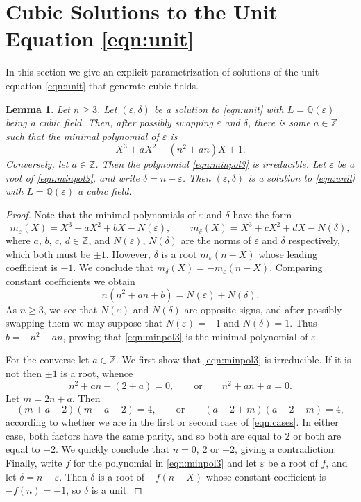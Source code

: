 \documentclass{amsart}
\newcommand{\Q}{\mathbb{Q}}
\newcommand{\Z}{\mathbb{Z}}
\newtheorem{lem}[thm]{Lemma}
\theoremstyle{definition}
\theoremstyle{remark}
\begin{document}
\section{Cubic Solutions to the Unit Equation \eqref{eqn:unit}}
In this section we give an explicit parametrization of solutions
of the unit equation \eqref{eqn:unit} that generate cubic fields.
\begin{lem}\label{lem:minpol}
Let $n \ge 3$. Let $(\varepsilon,\delta)$ be a solution
	to \eqref{eqn:unit} with $L=\Q(\varepsilon)$ being
	a cubic field. Then,
	after possibly swapping $\varepsilon$ and $\delta$,
	there is some $a \in \Z$
	such that the minimal polynomial
	of $\varepsilon$ is 
	\begin{equation}\label{eqn:minpol3}
		X^3+a X^2-(n^2+an)X+1.
	\end{equation}
	Conversely, let $a \in \Z$.  Then the polynomial
	\eqref{eqn:minpol3} is irreducible. Let
	$\varepsilon$ be
	a root of \eqref{eqn:minpol3},
	and write $\delta=n-\varepsilon$. Then $(\varepsilon,\delta)$
	is a solution to \eqref{eqn:unit} with $L=\Q(\varepsilon)$
	a cubic field.
\end{lem}
\begin{proof}
	Note that the minimal polynomials of $\varepsilon$
	and $\delta$ have the form
	\begin{equation}\label{eqn:ms}
		m_\varepsilon(X)=X^3+aX^2+bX-N(\varepsilon), \qquad m_\delta(X)=X^3+cX^2+dX-N(\delta),
	\end{equation}
	where $a$, $b$, $c$, $d \in \Z$, and $N(\varepsilon)$, $N(\delta)$ are the norms of $\varepsilon$
	and $\delta$ respectively, which both must be $\pm 1$. 
	However, $\delta$ is a root $m_\varepsilon(n-X)$ whose leading
	coefficient is $-1$. We conclude that $m_\delta(X)=-m_\varepsilon(n-X)$.
	Comparing constant coefficients we obtain
	\[
		n(n^2+an+b)=N(\varepsilon)+N(\delta).
	\]
	As $n \ge 3$, we see that $N(\varepsilon)$ and $N(\delta)$
	are opposite signs, and after possibly swapping them
	we may suppose that $N(\varepsilon)=-1$ and $N(\delta)=1$.
	Thus $b=-n^2-an$, proving that \eqref{eqn:minpol3}
	is the minimal polynomial of $\varepsilon$.

	For the converse let $a \in \Z$. We first show that
	\eqref{eqn:minpol3} is irreducible. If it is not then
	$\pm 1$ is a root, whence
	\begin{equation}\label{eqn:cases}
		n^2+an-(2+a)=0, \qquad \text{or} \qquad n^2+an+a=0.
	\end{equation}
	Let $m=2n+a$. Then
	\[
		(m+a+2)(m-a-2)=4, \qquad \text{or} \qquad
		(a-2+m)(a-2-m)=4,
	\]
	according to whether we are in the first or second case of 
	\eqref{eqn:cases}. In either case, both factors
	have the same parity, and so both are equal to $2$
	or both are equal to $-2$.
	We quickly conclude that $n=0$, $2$ or $-2$, giving a contradiction.
	Finally, write $f$ for the polynomial in \eqref{eqn:minpol3}
	and let $\varepsilon$ be a root of $f$,
	and let $\delta=n-\varepsilon$. Then $\delta$ is a root 
	of $-f(n-X)$ whose constant coefficient is 
	$-f(n)=-1$, so $\delta$ is a unit.
\end{proof}
\end{document}

